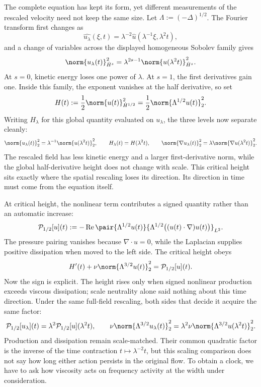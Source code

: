 The complete equation has kept its form, yet different measurements of the rescaled velocity need not keep the same size. Let \(\Lambda:=(-\Delta)^{1/2}\). The Fourier transform first changes as
\[
  \widehat{u_\lambda}(\xi,t)
  =
  \lambda^{-2}\widehat u(\lambda^{-1}\xi,\lambda^2t),
\]
and a change of variables across the displayed homogeneous Sobolev family gives
\[
  \norm{u_\lambda(t)}_{\dot H^s}^2
  =
  \lambda^{2s-1}
  \norm{u(\lambda^2t)}_{\dot H^s}^2.
\]
At \(s=0\), kinetic energy loses one power of \(\lambda\). At \(s=1\), the first derivatives gain one. Inside this family, the exponent vanishes at the half derivative, so set
\[
  H(t)
  :=
  \frac12\norm{u(t)}_{\dot H^{1/2}}^2
  =
  \frac12\norm{\Lambda^{1/2}u(t)}_2^2.
\]
Writing \(H_\lambda\) for this global quantity evaluated on \(u_\lambda\), the three levels now separate cleanly:
\[
  \norm{u_\lambda(t)}_2^2
  =
  \lambda^{-1}\norm{u(\lambda^2t)}_2^2,
  \qquad
  H_\lambda(t)=H(\lambda^2t),
  \qquad
  \norm{\nabla u_\lambda(t)}_2^2
  =
  \lambda\norm{\nabla u(\lambda^2t)}_2^2.
\]
The rescaled field has less kinetic energy and a larger first-derivative norm, while the global half-derivative height does not change with scale. This critical height sits exactly where the spatial rescaling loses its direction. Its direction in time must come from the equation itself.


At critical height, the nonlinear term contributes a signed quantity rather than an automatic increase:
\[
  \mathcal P_{1/2}[u](t)
  :=
  -\operatorname{Re}
  \pair
    {\Lambda^{1/2}u(t)}
    {\Lambda^{1/2}\bigl((u(t)\cdot\nabla)u(t)\bigr)}_{L^2}.
\]
The pressure pairing vanishes because \(\nabla\cdot u=0\), while the Laplacian supplies positive dissipation when moved to the left side. The critical height obeys
\[
  H'(t)
  +
  \nu\norm{\Lambda^{3/2}u(t)}_2^2
  =
  \mathcal P_{1/2}[u](t).
\]
Now the sign is explicit. The height rises only when signed nonlinear production exceeds viscous dissipation; scale neutrality alone said nothing about this time direction. Under the same full-field rescaling, both sides that decide it acquire the same factor:
\[
  \mathcal P_{1/2}[u_\lambda](t)
  =
  \lambda^2\mathcal P_{1/2}[u](\lambda^2t),
  \qquad
  \nu\norm{\Lambda^{3/2}u_\lambda(t)}_2^2
  =
  \lambda^2\nu\norm{\Lambda^{3/2}u(\lambda^2t)}_2^2.
\]
Production and dissipation remain scale-matched. Their common quadratic factor is the inverse of the time contraction \(t\mapsto\lambda^{-2}t\), but this scaling comparison does not say how long either action persists in the original flow. To obtain a clock, we have to ask how viscosity acts on frequency activity at the width under consideration.

